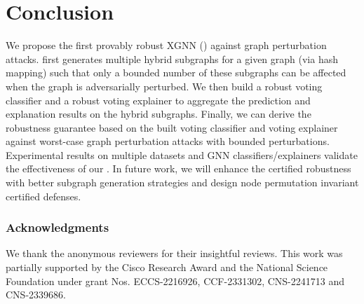 \vspace{-2mm}
\section{Conclusion}
\label{sec:conclusion}

\vspace{-2mm}
We propose the first provably robust XGNN (\emph{\name}) against graph perturbation attacks. {\name} first generates multiple hybrid subgraphs for a given graph (via hash mapping) such that only a bounded number of these subgraphs can be affected when the graph is adversarially perturbed. 
We then build a robust voting classifier and a robust voting explainer to aggregate the prediction and explanation results on the hybrid subgraphs. 
Finally, we can derive the robustness guarantee based on the built voting classifier and voting explainer against worst-case graph perturbation attacks  with bounded perturbations. Experimental results on multiple datasets and GNN classifiers/explainers validate the effectiveness of our {\name}.   
{In future work, we will enhance the certified robustness with better subgraph generation strategies and design node permutation invariant certified defenses.} 


\subsubsection*{Acknowledgments}
We thank the anonymous reviewers for their insightful reviews. This work was partially supported by the Cisco Research Award and the National Science Foundation under grant Nos. ECCS-2216926, CCF-2331302, CNS-2241713 and CNS-2339686. 